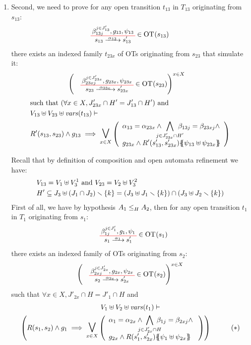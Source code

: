 \documentclass[runningheads]{llncs}
\begin{document}
\begin{enumerate}
\item Second, we need to prove for any open transition $t_{13}$ in $T_{13}$ originating from $s_{13}$:
\begin{align*}
		&  \OTx{13}{}{13}{13} \in \fOT{s_{13}}
\end{align*}		
there exists an indexed family $t_{23x}$ of OTs originating from $s_{23}$ that simulate it: 
\begin{align*}
		&  \mpar{\OTx{23}{x}{23x}{23x} \in \fOT{s_{23}}}^{x \in X}
\end{align*}	
\begin{align*}		
		& \text{such that } \mpar{\forall x \in X, J'_{23x} \cap H' = J'_{13} \cap H'} \text{ and }\\
		&  V_{13} \uplus V_{23} \uplus \fvars{t_{13}} \vdash\\
		& R'\mpar{s_{13}, s_{23}} \wedge g_{13} \implies \operatorname*{\bigsymb{\bigvee}}_{x \in X} \mpar{\everymath{\displaystyle}\begin{array}{l}
			\alpha_{13} = \alpha_{23x} \wedge \bigwedge_\subbox{j \in J'_{23x} \cap H'} \beta_{13j} = \beta_{23xj} \wedge\\[12pt]
			 g_{23x} \wedge R'\mpar{s'_{13}, s'_{23x}}\psubst{\psi_{13} \uplus \psi_{23x}}
		\end{array}} 
	\end{align*}


Recall that by definition of composition and open automata refinement we have: 
\begin{align*}
&V_{13}= V_1\uplus V^1_3 \text{ and }
V_{23}= V_2\uplus V^2_3\\
& H' \subseteq J_3\uplus \mpar{J_1 \cap J_2} \setminus \{k\} = \mpar{J_3\uplus J_1 \setminus \{k\} } \cap \mpar{J_3\uplus J_2 \setminus \{k\}} \\
\end{align*}
First of all, we have by hypothesis $\wrel{A_1}{A_2}{H}$, then for any open transition $t_1$ in $T_1$  originating from $s_1$:
\begin{align*}
\OTx{1}{}{1}{1} \in \fOT{s_1}
\end{align*}
there exists an indexed family of OTs originating from $s_{2}$: 
\begin{align*}
\mpar{\OTx{2}{x}{2x}{2x} \in \fOT{s_{2}}}^{x \in X} 
\end{align*}
such that $\forall x \in X, J'_{2x} \cap H = J'_1 \cap H$ and
\begin{multline*}
V_1 \uplus V_2 \uplus \fvars{t_1} \vdash\\ \mpar{R\mpar{s_1, s_{2}} \wedge g_1 \implies \operatorname*{\bigsymb{\bigvee}}_{x \in X} \mpar{\everymath{\displaystyle}
\begin{array}{l}
			\alpha_1 = \alpha_{2x} \wedge \bigwedge_\subbox{j \in J'_{2x} \cap H} \beta_{1j} = \beta_{2xj} \nwedge\\
			 g_{2x} \wedge R\mpar{s'_1, s'_{2x}}\psubst{\psi_1 \uplus \psi_{2x}}
		\end{array}}}  \qquad \quad (*)
\end{multline*}	
\smallskip


\end{enumerate}
\end{document}
